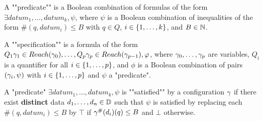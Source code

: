\begin{definition}
	A ""predicate"" is a Boolean combination of formulas of the form $\exists datum_1, \ldots, datum_k, \psi$, where $\psi$ is a Boolean combination of inequalities of the form $\#(q,datum_i) \leq B$ with $q\in Q$, $i \in \{1,\dots,k\}$, and $B \in \mathbb{N}$.
	
	A ""specification"" is a formula of the form $Q_1 \gamma_1  \in Reach(\gamma_0), \ldots, Q_p \gamma_p \in Reach(\gamma_{p-1}), \varphi$, where $\gamma_0, \ldots, \gamma_{p}$ are variables, $Q_i$ is a quantifier for all $i \in \{1,\dots,p\}$, and $\phi$ is a Boolean combination of pairs $(\gamma_i, \psi)$ with $i \in \{1,\dots,p\}$ and $\psi$ a "predicate".
	
\end{definition}

A "predicate" $\exists datum_1, \ldots, datum_k, \psi$ is ""satisfied"" by a configuration $\gamma$ if there exist \textbf{distinct} data $d_1, \ldots, d_n \in \mathbb{D}$ such that $\psi$ is satisfied by replacing each $\#(q,datum_i) \leq B$ by $\top$ if $\gamma^{\#}(d_i)(q) \leq B$ and $\bot$ otherwise.
